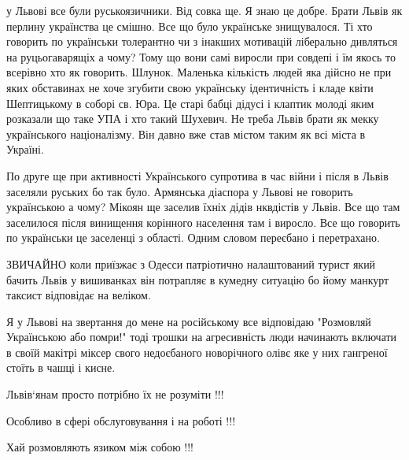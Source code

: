 \begin{itemize}
\begin{itemize}
у Львові все були руськоязичники. Від совка ще. Я знаю це добре. Брати Львів як
перлину українства це смішно. Все що було українське знищувалося. Ті хто
говорить по українськи толерантно чи з інакших мотивацій ліберально дивляться
на руцьогаварящіх а чому? Тому що вони самі виросли при совдепі і їм якось то
всерівно хто як говорить. Шлунок. Маленька кількість людей яка дійсно не при
яких обставинах не хоче згубити свою українську ідентичність і кладе квіти
Шептицькому в соборі св. Юра. Це старі бабці дідусі і клаптик молоді яким
розказали що таке УПА і хто такий Шухевич. Не треба Львів брати як мекку
українського націоналізму. Він давно вже став містом таким як всі міста в
Україні. 

По друге ще при активності Українського супротива в час війни і після в Львів
заселяли руських бо так було. Армянська діаспора у Львові не говорить
українською а чому? Мікоян ще заселив їхніх дідів нквдістів у Львів. Все що там
заселилося після винищення корінного населення там і виросло. Все що говорить
по українськи це заселенці з області. Одним словом переєбано і перетрахано. 

ЗВИЧАЙНО коли приїзжає з Одесси патріотично налаштований турист який бачить
Львів у вишиванках він потрапляє в кумедну ситуацію бо йому манкурт таксист
відповідає на веліком. 

Я у Львові на звертання до мене на російському все відповідаю "Розмовляй
Українською або помри!" тоді трошки на агресивність люди начинають включати в
своїй макітрі міксер свого недоєбаного новорічного олівє яке у них гангреної
стоїть в чашці і кисне.

\end{itemize}

 

Львів‘янам просто потрібно їх не розуміти !!!

Особливо в сфері обслуговування і на роботі !!!

Хай розмовляють язиком між собою !!!

\begin{itemize}
 

\end{itemize}
\end{itemize}

